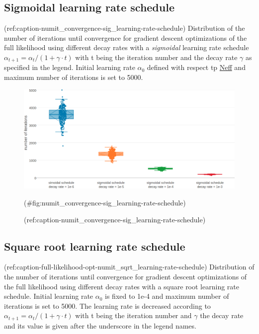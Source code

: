 \documentclass[12pt,a4paper,twoside]{book}
\theoremstyle{definition}
\theoremstyle{definition}
\theoremstyle{remark}
\begin{document}
\subsection{Sigmoidal learning rate
schedule}\label{sigmoidal-learning-rate-schedule-1}

(ref:caption-numit\_convergence-sig\_learning-rate-schedule)
Distribution of the number of iterations until convergence for gradient
descent optimizations of the full likelihood using different decay rates
with a \emph{sigmoidal} learning rate schedule
\(\alpha_{t+1} = \alpha_{t} / (1 + \gamma \cdot t)\) with t being the
iteration number and the decay rate \(\gamma\) as specified in the
legend. Initial learning rate \(\alpha_0\) defined with respect tp
\protect\hyperlink{abbrev}{Neff} and maximum number of iterations is set
to 5000.

\begin{figure}

{\centering \includegraphics[width=1\linewidth]{img/full_likelihood/appendix/distribution_numiterations_against_sigmoidal_learningrate_schedule} 

}

\caption{(ref:caption-numit_convergence-sig_learning-rate-schedule)}(\#fig:numit_convergence-sig_learning-rate-schedule)
\end{figure}

\subsection{Square root learning rate
schedule}\label{square-root-learning-rate-schedule-1}

(ref:caption-full-likelihood-opt-numit\_sqrt\_learning-rate-schedule)
Distribution of the number of iterations until convergence for gradient
descent optimizations of the full likelihood using different decay rates
with a square root learning rate schedule. Initial learning rate
\(\alpha_0\) is fixed to 1e-4 and maximum number of iterations is set to
5000. The learning rate is decreased according to
\(\alpha_{t+1} = \alpha_{t} / (1 + \gamma \cdot t)\) with t being the
iteration number and \(\gamma\) the decay rate and its value is given
after the underscore in the legend names.
\end{document}
